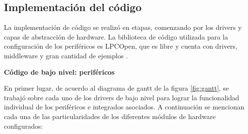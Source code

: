 \subsection{Implementación del código} \label{implementacion}

La implementación de código se realizó en etapas, comenzando por los drivers y capas de abstracción de hardware. La biblioteca de código utilizada para la configuración de los periféricos es LPCOpen, que es libre y cuenta con drivers, middleware y gran cantidad de ejemplos \citep{lpcopen2014}.

\textbf{Código de bajo nivel: periféricos}

En primer lugar, de acuerdo al diagrama de gantt de la figura \ref{fig:gantt}, se trabajó sobre cada uno de los drivers de bajo nivel para lograr la funcionalidad individual de los periféricos e integrados asociados. A continuación se mencionan cada una de las particularidades de los diferentes módulos de hardware configurados: 

